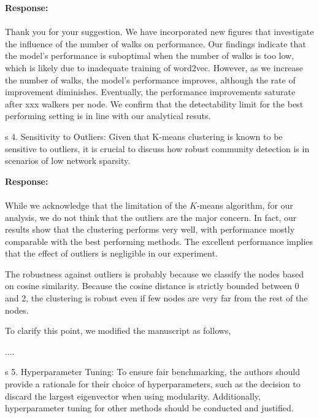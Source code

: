 \documentclass[12pt]{article}
\newcounter{comment}[subsection]
\newcommand{\response}[1]{{\noindent \textbf{Response:} \\ \\ \noindent #1}}
\newcommand{\rcomment}[1]{%
\vspace{10pt}
\begin{sectionbox}
s #1
\end{sectionbox}
}
\begin{document}
\response{
Thank you for your suggestion. We have incorporated new figures that investigate the influence of the number of walks on performance. Our findings indicate that the model's performance is suboptimal when the number of walks is too low, which is likely due to inadequate training of word2vec. However, as we increase the number of walks, the model's performance improves, although the rate of improvement diminishes. Eventually, the performance improvements saturate after xxx walkers per node. We confirm that the detectability limit for the best performing setting is in line with our analytical resuts. 
}

\rcomment{
4. Sensitivity to Outliers: Given that K-means clustering is known to be sensitive to outliers, it is crucial to discuss how robust community detection is in scenarios of low network sparsity. 
}

\response{
While we acknowledge that the limitation of the $K$-means algorithm, for our analysis, we do not think that the outliers are the major concern.
In fact, our results show that the clustering performs very well, with performance mostly comparable with the best performing methods. The excellent performance implies that the effect of outliers is negligible in our experiment. 

The robustness against outliers is probably because we classify the nodes based on cosine similarity. Because the cosine distance is strictly bounded between 0 and 2, the clustering is robust even if few nodes are very far from the rest of the nodes. 

To clarify this point, we modified the manuscript as follows,
}

....


\rcomment{
5. Hyperparameter Tuning: To ensure fair benchmarking, the authors should provide a rationale for their choice of hyperparameters, such as the decision to discard the largest eigenvector when using modularity. Additionally, hyperparameter tuning for other methods should be conducted and justified.
}
\end{document}
